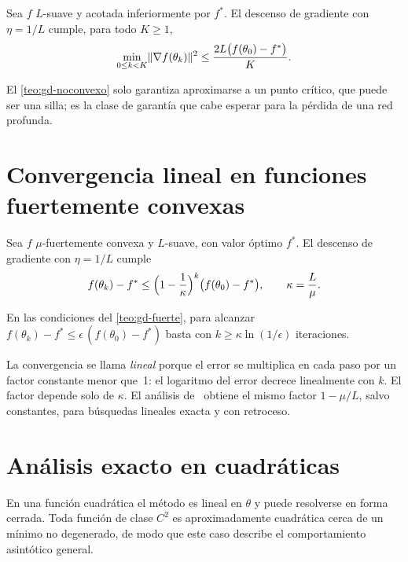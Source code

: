 \begin{teorema}\label{teo:gd-noconvexo}
Sea $f$ $L$-suave y acotada inferiormente por $f^{\ast}$. El descenso de gradiente con $\eta=1/L$ cumple, para todo $K\ge 1$,
\[
\min_{0\le k<K}\lVert\nabla f(\theta_k)\rVert^{2}\le\frac{2L\bigl(f(\theta_0)-f^{\ast}\bigr)}{K}.
\]
\end{teorema}

El \cref{teo:gd-noconvexo} solo garantiza aproximarse a un punto crítico, que puede ser una silla; es la clase de garantía que cabe esperar para la pérdida de una red profunda.

\section{Convergencia lineal en funciones fuertemente convexas}

\begin{teorema}\label{teo:gd-fuerte}
Sea $f$ $\mu$-fuertemente convexa y $L$-suave, con valor óptimo $f^{\ast}$. El descenso de gradiente con $\eta=1/L$ cumple
\[
f(\theta_k)-f^{\ast}\le\Bigl(1-\frac{1}{\kappa}\Bigr)^{k}\bigl(f(\theta_0)-f^{\ast}\bigr),\qquad\kappa=\frac{L}{\mu}.
\]
\end{teorema}

\begin{corolario}\label{cor:iteraciones}
En las condiciones del \cref{teo:gd-fuerte}, para alcanzar $f(\theta_k)-f^{\ast}\le\epsilon\,(f(\theta_0)-f^{\ast})$ basta con $k\ge\kappa\ln(1/\epsilon)$ iteraciones.
\end{corolario}

La convergencia se llama \emph{lineal} porque el error se multiplica en cada paso por un factor constante menor que~1: el logaritmo del error decrece linealmente con $k$. El factor depende solo de $\kappa$. El análisis de~\cite[§9.3]{bv} obtiene el mismo factor $1-\mu/L$, salvo constantes, para búsquedas lineales exacta y con retroceso.

\section{Análisis exacto en cuadráticas}

En una función cuadrática el método es lineal en $\theta$ y puede resolverse en forma cerrada. Toda función de clase $C^{2}$ es aproximadamente cuadrática cerca de un mínimo no degenerado, de modo que este caso describe el comportamiento asintótico general.

